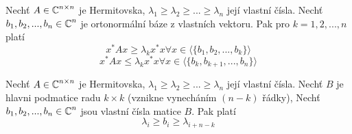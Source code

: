 \begin{theorem}
	Nechť $A \in \operatorname{\mathbb{C}}^{n \times n}$ je Hermitovska, $\lambda_1 \geq \lambda_2 \geq ... \geq \lambda_n$ její vlastní čísla.
	Nechť $b_1, b_2, ..., b_n \in \operatorname{\mathbb{C}}^n$ je ortonormální báze z vlastních vektoru. Pak pro $k = 1, 2, ..., n$ platí
	\[ x^{\ast}Ax \geq \lambda_k x^{\ast}x \forall x \in \langle \{ b_1, b_2, ..., b_k\} \rangle \]
	\[ x^{\ast}Ax \leq \lambda_k x^{\ast}x \forall x \in \langle \{ b_k, b_{k+1}, ..., b_n\} \rangle \]
\end{theorem}

\begin{theorem}
	Nechť $A \in \operatorname{\mathbb{C}}^{n \times n}$ je Hermitovska, $\lambda_1 \geq \lambda_2 \geq ... \geq \lambda_n$ její vlastní čísla.
	Nechť $B$ je hlavni podmatice radu $k \times k$ (vznikne vynecháním $(n - k)$ řádky),
	Nechť $b_1, b_2, ..., b_n \in \operatorname{\mathbb{C}}^n$ jsou vlastní čísla matice $B$. Pak platí
	\[ \lambda_i \geq b_i \geq \lambda_{i + n - k} \]
\end{theorem}
